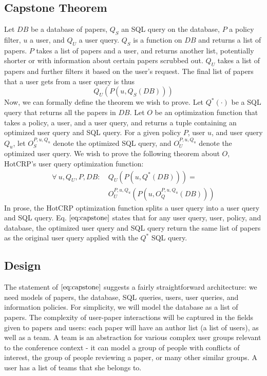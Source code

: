 \documentclass[11pt,journal]{IEEEtran}
\begin{document}
\subsection{Capstone Theorem}
Let $DB$ be a database of papers, $Q_S$ an SQL query on the database, $P$ a policy filter, $u$ a user, and $Q_U$ a user query.  $Q_S$ is a function on $DB$ and returns a list of papers.  $P$ takes a list of papers and a user, and returns another list, potentially shorter or with information about certain papers scrubbed out.  $Q_U$ takes a list of papers and further filters it based on the user's request.  The final list of papers that a user gets from a user query is thus $$Q_U(P(u, Q_S(DB)))$$
Now, we can formally define the theorem we wish to prove.  Let $Q^*(\cdot)$ be a SQL query that returns all the papers in $DB$.  Let $O$ be an optimization function that takes a policy, a user, and a user query, and returns a tuple containing an optimized user query and SQL query.  For a given policy $P$, user $u$, and user query $Q_u$, let $O^{P,u,Q_u}_S$ denote the optimized SQL query, and $O^{P,u,Q_u}_U$ denote the optimized user query.  We wish to prove the following theorem about $O$, HotCRP's user query optimization function:
\begin{equation}
\label{eq:capstone}
\begin{split}
    \forall~u, Q_U, P, DB:~& Q_U(P(u, Q^*(DB))) = \\
    & O^{P,u,Q_u}_U(P(u, O^{P,u,Q_u}_Q(DB)))
\end{split}
\end{equation}
In prose, the HotCRP optimization function splits a user query into a user query and SQL query.  Eq. $\eqref{eq:capstone}$ states that for any user query, user, policy, and database, the optimized user query and SQL query return the same list of papers as the original user query applied with the $Q^*$ SQL query.

\subsection{Design}
The statement of $\eqref{eq:capstone}$ suggests a fairly straightforward architecture: we need models of papers, the database, SQL queries, users, user queries, and information policies.  For simplicity, we will model the database as a list of papers.  The complexity of user-paper interactions will be captured in the fields given to papers and users: each paper will have an author list (a list of users), as well as a team.  A team is an abstraction for various complex user groups relevant to the conference context - it can model a group of people with conflicts of interest, the group of people reviewing a paper, or many other similar groups.  A user has a list of teams that she belongs to.
\end{document}
